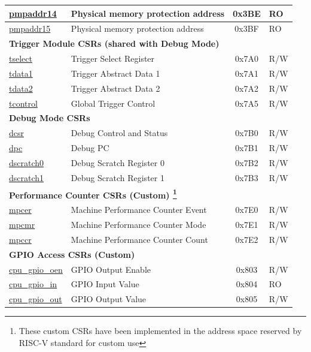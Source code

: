 \begin{longtable}{ | p{4.0cm} | p{8.4cm} | c | l | }
\hyperref[sec:riscvcpu-pmp-reg-desc]{pmpaddr14} & Physical memory protection address & 0x3BE & RO \\\hline
\hyperref[sec:riscvcpu-pmp-reg-desc]{pmpaddr15} & Physical memory protection address & 0x3BF & RO \\\hline
\multicolumn{4}{|l|}{\textbf{Trigger Module CSRs (shared with Debug Mode)}} \\\hline
\hyperref[regdesc:TSELECT]{tselect} & Trigger Select Register & 0x7A0 & R/W \\\hline
\hyperref[regdesc:TDATA1]{tdata1} & Trigger Abstract Data 1 & 0x7A1 & R/W \\\hline
\hyperref[regdesc:TDATA2]{tdata2} & Trigger Abstract Data 2 & 0x7A2 & R/W \\\hline
\hyperref[regdesc:TCONTROL]{tcontrol} & Global Trigger Control & 0x7A5 & R/W \\\hline
\multicolumn{4}{|l|}{\textbf{Debug Mode CSRs}} \\\hline
\hyperref[regdesc:DCSR]{dcsr} & Debug Control and Status  & 0x7B0 & R/W \\\hline
\hyperref[regdesc:DPC]{dpc} & Debug PC & 0x7B1 & R/W \\\hline
\hyperref[regdesc:DSCRATCH0]{dscratch0} & Debug Scratch Register 0 & 0x7B2 & R/W \\\hline
\hyperref[regdesc:DSCRATCH1]{dscratch1} & Debug Scratch Register 1 & 0x7B3 & R/W \\\hline
\multicolumn{4}{|l|}{\textbf{Performance Counter CSRs (Custom) \footnote{These custom CSRs have been implemented in the address space reserved by RISC-V standard for custom use}}} \\\hline
\hyperref[regdesc:MPCER]{mpcer} & Machine Performance Counter Event & 0x7E0 & R/W \\\hline
\hyperref[regdesc:MPCMR]{mpcmr} & Machine Performance Counter Mode & 0x7E1 & R/W \\\hline
\hyperref[regdesc:MPCCR]{mpccr} & Machine Performance Counter Count & 0x7E2 & R/W \\\hline
\multicolumn{4}{|l|}{\textbf{GPIO Access CSRs (Custom)}} \\\hline
\hyperref[regdesc:GPIO_OEN]{cpu\_gpio\_oen} & GPIO Output Enable & 0x803 & R/W \\\hline
\hyperref[regdesc:GPIO_IN]{cpu\_gpio\_in} & GPIO Input Value & 0x804 & RO \\\hline
\hyperref[regdesc:GPIO_OUT]{cpu\_gpio\_out} & GPIO Output Value & 0x805 & R/W \\\hline
\end{longtable}
